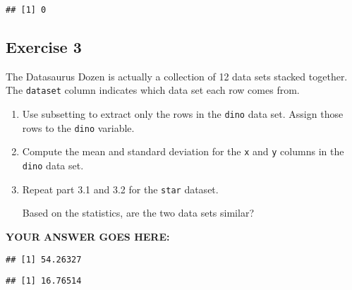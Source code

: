 \documentclass[
]{article}
\newenvironment{Shaded}{\begin{snugshade}}{\end{snugshade}}
\newcommand{\KeywordTok}[1]{\textcolor[rgb]{0.13,0.29,0.53}{\textbf{#1}}}
\newcommand{\NormalTok}[1]{#1}
\newcommand{\OperatorTok}[1]{\textcolor[rgb]{0.81,0.36,0.00}{\textbf{#1}}}
\newcommand{\StringTok}[1]{\textcolor[rgb]{0.31,0.60,0.02}{#1}}
\begin{document}
\begin{verbatim}
## [1] 0
\end{verbatim}

\hypertarget{exercise-3}{%
\subsection{Exercise 3}\label{exercise-3}}

The Datasaurus Dozen is actually a collection of 12 data sets stacked
together. The \texttt{dataset} column indicates which data set each row
comes from.

\begin{enumerate}
\def\labelenumi{\arabic{enumi}.}
\item
  Use subsetting to extract only the rows in the \texttt{dino} data set.
  Assign those rows to the \texttt{dino} variable.
\item
  Compute the mean and standard deviation for the \texttt{x} and
  \texttt{y} columns in the \texttt{dino} data set.
\item
  Repeat part 3.1 and 3.2 for the \texttt{star} dataset.

  Based on the statistics, are the two data sets similar?
\end{enumerate}

\textbf{YOUR ANSWER GOES HERE:}

\begin{Shaded}
\end{Shaded}

\begin{verbatim}
## [1] 54.26327
\end{verbatim}

\begin{Shaded}
\end{Shaded}

\begin{verbatim}
## [1] 16.76514
\end{verbatim}

\begin{Shaded}
\end{Shaded}
\end{document}
